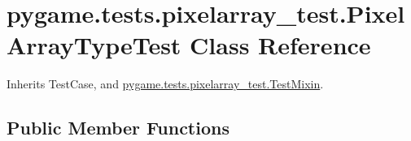 \hypertarget{classpygame_1_1tests_1_1pixelarray__test_1_1_pixel_array_type_test}{}\section{pygame.\+tests.\+pixelarray\+\_\+test.\+Pixel\+Array\+Type\+Test Class Reference}
\label{classpygame_1_1tests_1_1pixelarray__test_1_1_pixel_array_type_test}


Inherits Test\+Case, and \hyperlink{classpygame_1_1tests_1_1pixelarray__test_1_1_test_mixin}{pygame.\+tests.\+pixelarray\+\_\+test.\+Test\+Mixin}.

\subsection*{Public Member Functions}
